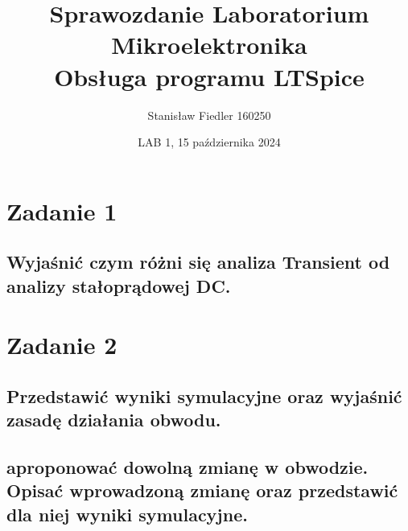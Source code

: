\documentclass[a4paper, 11pt]{article}
\title{%
       \large Sprawozdanie Laboratorium Mikroelektronika \\
       \huge Obsługa programu LTSpice}
\author{Stanisław Fiedler 160250}
\date{LAB 1, 15 października 2024}
\begin{document}
\maketitle
\tableofcontents

\section{Zadanie 1}

\subsection{Wyjaśnić czym różni się analiza Transient od analizy stałoprądowej DC.}\label{sub:1.1} %



\section{Zadanie 2}

\subsection{Przedstawić wyniki symulacyjne oraz wyjaśnić zasadę działania obwodu.}\label{sub:2.1} %


\subsection{aproponować dowolną zmianę w obwodzie. Opisać wprowadzoną zmianę oraz przedstawić dla
niej wyniki symulacyjne.}\label{sub:2.2} %

\end{document}
